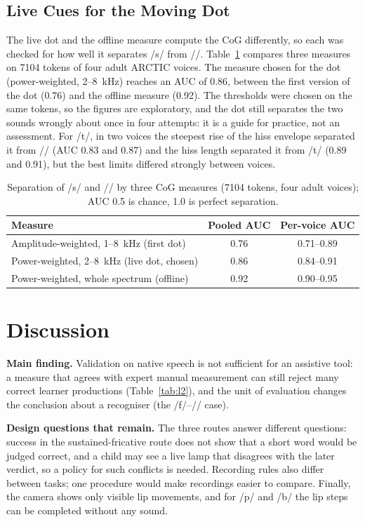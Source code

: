 \documentclass[engproc,article,submit,moreauthors]{Definitions/mdpi}
\newcommand{\ipa}[1]{/#1/}
\begin{document}
\subsection{Live Cues for the Moving Dot}
The live dot and the offline measure compute the CoG differently, so each was checked for how well it separates \ipa{s} from \ipa{\textesh}. Table~\ref{tab:cog} compares three measures on 7104 tokens of four adult ARCTIC voices. The measure chosen for the dot (power-weighted, 2--8~kHz) reaches an AUC of 0.86, between the first version of the dot (0.76) and the offline measure (0.92). The thresholds were chosen on the same tokens, so the figures are exploratory, and the dot still separates the two sounds wrongly about once in four attempts: it is a guide for practice, not an assessment. For \ipa{t\textesh}, in two voices the steepest rise of the hiss envelope separated it from \ipa{\textesh} (AUC 0.83 and 0.87) and the hiss length separated it from \ipa{t} (0.89 and 0.91), but the best limits differed strongly between voices.

\begin{table}[!t]
\caption{Separation of \ipa{s} and \ipa{\textesh} by three CoG measures (7104 tokens, four adult voices); AUC 0.5 is chance, 1.0 is perfect separation.\label{tab:cog}}
\small
\begin{tabularx}{\textwidth}{Xcc}
\toprule
\textbf{Measure} & \textbf{Pooled AUC} & \textbf{Per-voice AUC}\\
\midrule
Amplitude-weighted, 1--8~kHz (first dot) & 0.76 & 0.71--0.89\\
Power-weighted, 2--8~kHz (live dot, chosen) & 0.86 & 0.84--0.91\\
Power-weighted, whole spectrum (offline) & 0.92 & 0.90--0.95\\
\bottomrule
\end{tabularx}
\end{table}

\section{Discussion}\label{sec:disc}
\textbf{Main finding.} Validation on native speech is not sufficient for an assistive tool: a measure that agrees with expert manual measurement can still reject many correct learner productions (Table~\ref{tab:l2}), and the unit of evaluation changes the conclusion about a recogniser (the \ipa{f}--\ipa{\texttheta} case).

\textbf{Design questions that remain.} The three routes answer different questions: success in the sustained-fricative route does not show that a short word would be judged correct, and a child may see a live lamp that disagrees with the later verdict, so a policy for such conflicts is needed. Recording rules also differ between tasks; one procedure would make recordings easier to compare. Finally, the camera shows only visible lip movements, and for \ipa{p} and \ipa{b} the lip steps can be completed without any sound.
\end{document}
